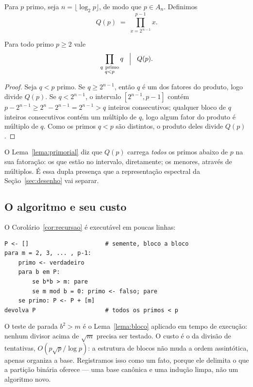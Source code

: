 \begin{definicao}\label{def:Q}
Para $p$ primo, seja $n=\lfloor\log_2 p\rfloor$, de modo que $p\in A_n$. Definimos
\[
  Q(p) \;=\; \prod_{x=2^{\,n-1}}^{p-1} x .
\]
\end{definicao}

\begin{lema}\label{lema:primorial}
Para todo primo $p\ge2$ vale
\[
  \prod_{\substack{q\ \mathrm{primo}\\ q<p}} q \;\;\Bigm|\;\; Q(p).
\]
\end{lema}

\begin{proof}
Seja $q<p$ primo. Se $q\ge2^{n-1}$, então $q$ é um dos fatores do produto, logo
divide $Q(p)$. Se $q<2^{n-1}$, o intervalo $[2^{n-1},p-1]$ contém
$p-2^{n-1}\ge 2^n-2^{n-1}=2^{n-1}>q$ inteiros consecutivos; qualquer bloco de $q$
inteiros consecutivos contém um múltiplo de $q$, logo algum fator do produto é
múltiplo de $q$. Como os primos $q<p$ são distintos, o produto deles divide
$Q(p)$.
\end{proof}

O Lema~\ref{lema:primorial} diz que $Q(p)$ carrega \emph{todos} os primos abaixo
de $p$ na sua fatoração: os que estão no intervalo, diretamente; os menores,
através de múltiplos. É essa dupla presença que a representação espectral da
Seção~\ref{sec:desenho} vai separar.

\subsection{O algoritmo e seu custo}

O Corolário~\ref{cor:recursao} é executável em poucas linhas:

\begin{center}
\begin{minipage}{0.95\textwidth}
\footnotesize
\begin{verbatim}
P <- []                      # semente, bloco a bloco
para m = 2, 3, ... , p-1:
    primo <- verdadeiro
    para b em P:
        se b*b > m: pare
        se m mod b = 0: primo <- falso; pare
    se primo: P <- P + [m]
devolva P                    # todos os primos < p
\end{verbatim}
\end{minipage}
\end{center}

O teste de parada $b^2>m$ é o Lema~\ref{lema:bloco} aplicado em tempo de execução:
nenhum divisor acima de $\sqrt m$ precisa ser testado. O custo é o da divisão de
tentativas, $O(p\sqrt p/\log p)$: a estrutura de blocos não muda a ordem
assintótica, apenas organiza a base. Registramos isso como um fato, porque ele
delimita o que a partição binária oferece — uma base canônica e uma indução limpa,
não um algoritmo novo.

